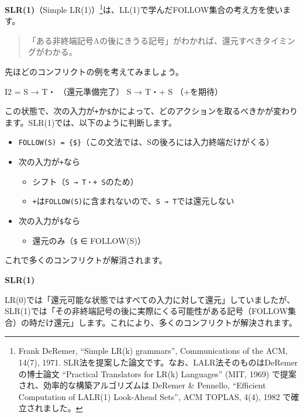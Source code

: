 \textbf{\sffamily SLR(1)}（Simple
LR(1)）\footnote{Frank DeRemer, ``Simple LR(k) grammars'',
  Communications of the ACM, 14(7), 1971.
  SLR法を提案した論文です。なお、LALR法そのものはDeRemerの博士論文
  ``Practical Translators for LR(k) Languages'' (MIT, 1969)
  で提案され、効率的な構築アルゴリズムは DeRemer \& Pennello,
  ``Efficient Computation of LALR(1) Look-Ahead Sets'', ACM TOPLAS,
  4(4), 1982 で確立されました。}は、LL(1)で学んだFOLLOW集合の考え方を使います。

\noindent{}
\begin{quotation}
  「ある非終端記号Aの後にきうる記号」がわかれば、還元すべきタイミングがわかる。
\end{quotation}

先ほどのコンフリクトの例を考えてみましょう。

\begin{codescreen}{}
I2 = {
    S → T・       （還元準備完了）
    S → T・+ S    （+を期待）
}
\end{codescreen}

この状態で、次の入力が\texttt{+}か\texttt{\$}かによって、どのアクションを取るべきかが変わります。SLR(1)では、以下のように判断します。

\begin{itemize}
\item
  \texttt{FOLLOW(S)\ =\ \{\$\}}（この文法では、Sの後ろには入力終端だけがくる）
\item
  次の入力が\texttt{+}なら
  \begin{itemize}
  \item
    シフト（\texttt{S\ →\ T・+\ S}のため）
  \item
    \texttt{+}は\texttt{FOLLOW(S)}に含まれないので、\texttt{S\ →\ T}では還元しない
  \end{itemize}
\item
  次の入力が\texttt{\$}なら
  \begin{itemize}
  \item
    還元のみ（\texttt{\$} ∈ FOLLOW(S)）
  \end{itemize}
\end{itemize}

これで多くのコンフリクトが解消されます。

\noindent\textbf{\sffamily SLR(1)}

LR(0)では「還元可能な状態ではすべての入力に対して還元」していましたが、SLR(1)では「その非終端記号の後に実際にくる可能性がある記号（FOLLOW集合）の時だけ還元」します。これにより、多くのコンフリクトが解決されます。

